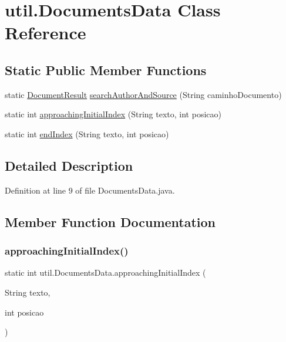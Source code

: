 \hypertarget{classutil_1_1DocumentsData}{}\section{util.\+Documents\+Data Class Reference}
\label{classutil_1_1DocumentsData}
\subsection*{Static Public Member Functions}
\begin{DoxyCompactItemize}
\item 
static \hyperlink{classentidade_1_1resultados_1_1DocumentResult}{Document\+Result} \hyperlink{classutil_1_1DocumentsData_a8a08f5b6aab10fb5628aed6771e3938a}{search\+Author\+And\+Source} (String caminho\+Documento)
\item 
static int \hyperlink{classutil_1_1DocumentsData_a1ec1fd9ffe21a704659c0ae244c6bf64}{approaching\+Initial\+Index} (String texto, int posicao)
\item 
static int \hyperlink{classutil_1_1DocumentsData_ad153c5f3425b5dd0599df8a15df620ff}{end\+Index} (String texto, int posicao)
\end{DoxyCompactItemize}


\subsection{Detailed Description}


Definition at line 9 of file Documents\+Data.\+java.



\subsection{Member Function Documentation}
\hypertarget{classutil_1_1DocumentsData_a1ec1fd9ffe21a704659c0ae244c6bf64}{}\label{classutil_1_1DocumentsData_a1ec1fd9ffe21a704659c0ae244c6bf64} 
\subsubsection{\texorpdfstring{approaching\+Initial\+Index()}{approachingInitialIndex()}}
{\footnotesize\ttfamily static int util.\+Documents\+Data.\+approaching\+Initial\+Index (\begin{DoxyParamCaption}\item[{String}]{texto,  }\item[{int}]{posicao }\end{DoxyParamCaption})\hspace{0.3cm}{\ttfamily [static]}}



